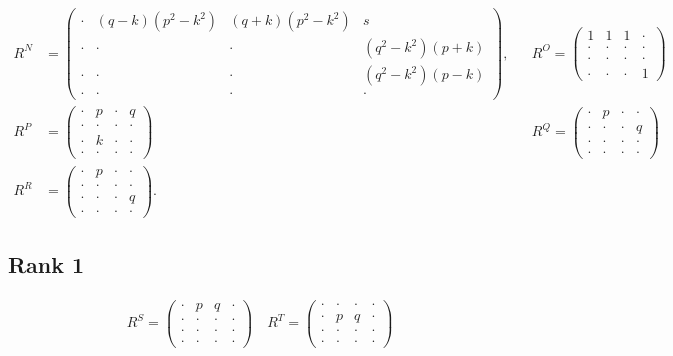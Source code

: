 \documentclass{article}
\begin{document}
\begin{align}
   R^N & =\begin{pmatrix}
        \cdot&(q-k)(p^2-k^2)&(q+k)(p^2-k^2)&s\\
        \cdot&\cdot&\cdot&(q^2-k^2)(p+k)\\
        \cdot&\cdot &\cdot&(q^2-k^2)(p-k)\\
        \cdot&\cdot &\cdot&\cdot
    \end{pmatrix},
&& R^O= \begin{pmatrix}
        1&1&1&\cdot \\
        \cdot&\cdot&\cdot&\cdot\\
        \cdot&\cdot&\cdot&\cdot\\
        \cdot&\cdot&\cdot&1
        \end{pmatrix}
\\
   R^P&=\begin{pmatrix}
        \cdot&p&\cdot&q\\
        \cdot&\cdot&\cdot&\cdot\\
        \cdot&k &\cdot&\cdot\\
        \cdot&\cdot &\cdot&\cdot
    \end{pmatrix}
&&
   R^Q= \begin{pmatrix}
        \cdot&p&\cdot&\cdot \\
        \cdot&\cdot&\cdot&q\\
        \cdot&\cdot&\cdot&\cdot\\
        \cdot&\cdot&\cdot&\cdot
    \end{pmatrix}
\\
   R^R&=\begin{pmatrix}
        \cdot&p&\cdot&\cdot\\
        \cdot&\cdot&\cdot&\cdot\\
        \cdot&\cdot &\cdot&q\\
        \cdot&\cdot &\cdot&\cdot
    \end{pmatrix}.
\end{align}

\subsection{Rank 1} 

\begin{align}
  R^S= \begin{pmatrix}
        \cdot&p&q&\cdot \\
        \cdot&\cdot&\cdot&\cdot\\
        \cdot&\cdot&\cdot&\cdot\\
        \cdot&\cdot&\cdot&\cdot
    \end{pmatrix}
    \quad
     R^T= \begin{pmatrix}
        \cdot&\cdot&\cdot&\cdot \\
        \cdot&p&q&\cdot\\
        \cdot&\cdot&\cdot&\cdot\\
        \cdot&\cdot&\cdot&\cdot
    \end{pmatrix} 
\end{align}
\end{document}
